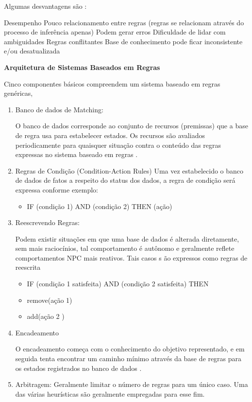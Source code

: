 \documentclass[12pt,a4paper,compsoc]{IEEEtran}
\begin{document}
Algumas desvantagens são :

Desempenho
Pouco relacionamento entre regras (regras se relacionam através do processo de inferência apenas)
Podem gerar erros
Dificuldade de lidar com ambiguidades
Regras conflitantes
Base de conhecimento  pode ficar inconsistente e/ou desatualizada

\textbf{Arquitetura de Sistemas Baseados em Regras}

Cinco componentes básicos compreendem um sistema baseado em regras genéricas,

\begin{enumerate}

\item Banco de dados de Matching: 

O banco de dados corresponde ao conjunto de recursos (premissas) que a base de regra usa para estabelecer estados. Os recursos são avaliados periodicamente para quaisquer situação contra o conteúdo das regras expressas no sistema baseado em regras .

\item Regras de Condição (Condition-Action Rules) Uma vez estabelecido o banco de dados de fatos a respeito do status dos dados, a regra de condição será expressa conforme exemplo:

\begin{itemize}
\item IF (condição 1) AND (condição 2) THEN (ação)
\end{itemize}

\item Reescrevendo Regras:

Podem existir situações em que uma base de dados é alterada diretamente, sem mais raciocínios, tal comportamento é autônomo e geralmente reflete comportamentos NPC mais reativos.
Tais casos s ão expressos como regras de reescrita 

\begin{itemize}
\item IF (condição 1 satisfeita) AND (condição 2 satisfeita) THEN 
\item remove(ação 1)
\item add(ação 2 )
\end{itemize}

\item Encadeamento 

O encadeamento  começa com o conhecimento do objetivo  representado, e em seguida tenta encontrar um caminho mínimo através da base de regras para os estados registrados no banco de dados .

 
\item Arbitragem: 
Geralmente limitar o número de regras para um único caso. Uma das várias heurísticas são geralmente empregadas para esse fim.

\end{enumerate}
\end{document}
